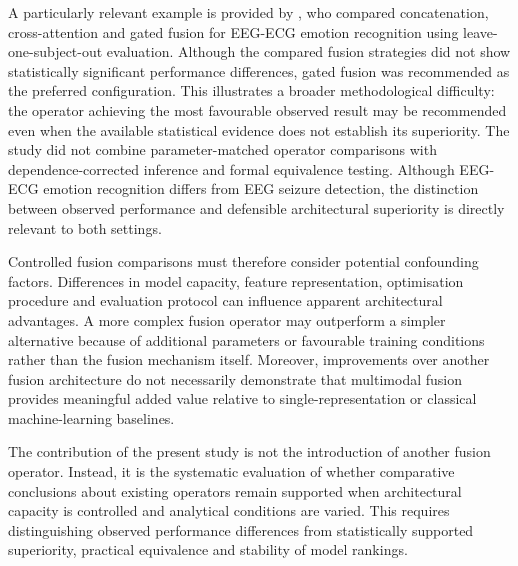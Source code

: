 \documentclass[11pt,a4paper]{article}
\begin{document}
A particularly relevant example is provided by \citet{Miantezila_Junior_2026}, who
compared concatenation, cross-attention and gated fusion for EEG-ECG emotion recognition
using leave-one-subject-out evaluation. Although the compared fusion strategies did not
show statistically significant performance differences, gated fusion was recommended as
the preferred configuration. This illustrates a broader methodological difficulty: the
operator achieving the most favourable observed result may be recommended even when the
available statistical evidence does not establish its superiority. The study did not
combine parameter-matched operator comparisons with dependence-corrected inference and
formal equivalence testing. Although EEG-ECG emotion recognition differs from EEG seizure
detection, the distinction between observed performance and defensible architectural
superiority is directly relevant to both settings.

Controlled fusion comparisons must therefore consider potential confounding factors.
Differences in model capacity, feature representation, optimisation procedure and
evaluation protocol can influence apparent architectural advantages. A more complex fusion
operator may outperform a simpler alternative because of additional parameters or
favourable training conditions rather than the fusion mechanism itself. Moreover,
improvements over another fusion architecture do not necessarily demonstrate that
multimodal fusion provides meaningful added value relative to single-representation or
classical machine-learning baselines.

The contribution of the present study is not the introduction of another fusion operator.
Instead, it is the systematic evaluation of whether comparative conclusions about existing
operators remain supported when architectural capacity is controlled and analytical
conditions are varied. This requires distinguishing observed performance differences from
statistically supported superiority, practical equivalence and stability of model
rankings.

\begingroup\small
\end{document}

